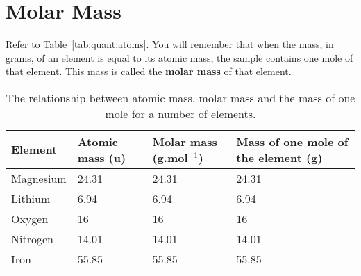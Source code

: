 



\section{Molar Mass}
\label{subsec:quant:mm}


Refer to Table~\ref{tab:quant:atoms}. You will remember that when the mass, in grams, of an element is equal to its atomic mass, the sample contains one mole of that element. This mass is called the \textbf{molar mass} of that element.

\begin{table}[h]
\begin{center}
\begin{tabular}{|m{2cm}|m{2.5cm}|m{2.2cm}|m{3cm}|}\hline
\textbf{Element} & \textbf{Atomic mass (u)} & \textbf{Molar mass (g.mol$^{-1}$)} & \textbf{Mass of one mole of the element (g)} \\\hline
Magnesium & 24.31 & 24.31 & 24.31 \\\hline
Lithium & 6.94 & 6.94 & 6.94 \\\hline
Oxygen & 16 & 16 & 16 \\\hline
Nitrogen & 14.01 & 14.01 & 14.01 \\\hline
Iron & 55.85 & 55.85 & 55.85 \\\hline
\end{tabular}
\caption{The relationship between atomic mass, molar mass and the mass of one mole for a number of elements.}
\label{tab:mole summary}
\end{center}
\end{table}

